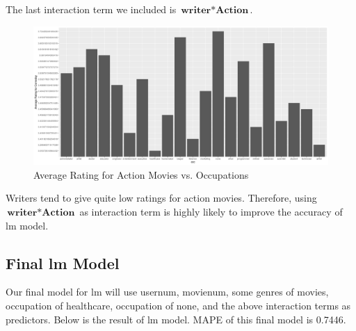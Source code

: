 \documentclass[11pt]{article}
\begin{document}
The last interaction term we included is $\textbf{writer} * \textbf{Action}$.
\begin{figure}[ht!]
\begin{center}
\includegraphics[width=\textwidth]{action.png}
\caption{Average Rating for Action Movies vs. Occupations}
\end{center}
\end{figure}
Writers tend to give quite low ratings for action movies. 
Therefore, using $\textbf{writer} * \textbf{Action}$ as interaction
term is highly likely to improve the accuracy of lm model.

\subsection{Final lm Model}
Our final model for lm will use usernum, movienum, some genres of 
movies, occupation of healthcare, occupation of none, and the above 
interaction terms as predictors. Below is the result of lm model. 
MAPE of this final model is 0.7446.
\end{document}
